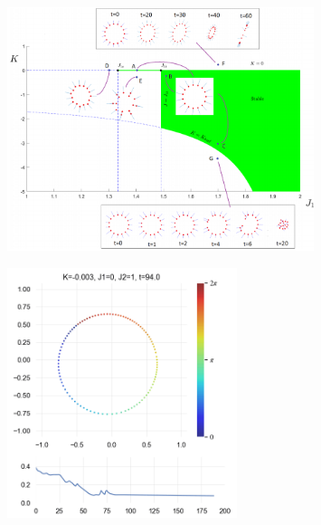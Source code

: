 \documentclass[10pt,aspectratio=43,mathserif,table]{beamer}
\begin{document}
\begin{frame}
    \begin{figure}
        \centering
        \includegraphics[width=0.8\textwidth]{f2.png}
    \end{figure}
\end{frame}

\begin{frame}
    \begin{figure}
        \centering
        \includegraphics[width=0.6\textwidth]{withOP.png}
    \end{figure}
\end{frame}
\end{document}
